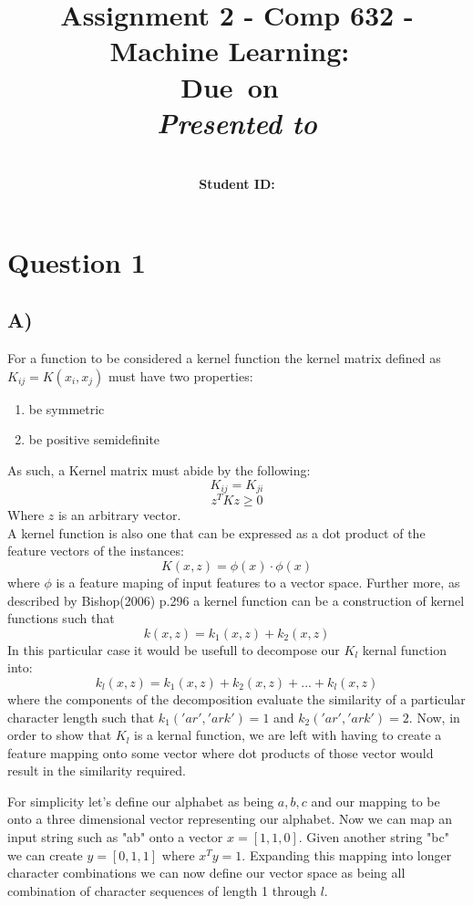 \documentclass{report}
\title{Assignment 2 - Comp 632 - Machine Learning}
\title{\vspace{2in}\textmd{\textbf{\hmwkClass:\ \hmwkTitle}}\\
\normalsize\vspace{0.1in}\small{Due\ on\ \hmwkDueDate}\\
\vspace{0.1in}\large{\textit{Presented to \hmwkClassInstructor}}\vspace{3in}}
\date{}
\author{\textbf{\hmwkAuthorName}\\
    \textbf{Student ID: \hmwkAuthorNumber}}
\begin{document}
\maketitle
\section*{Question 1}
\subsection*{A)}
For a function to be considered a kernel function the kernel matrix defined as
$K_{ij}=K(x_i,x_j)$ must have two properties:
\begin{enumerate}
  \item be symmetric
  \item be positive semidefinite
\end{enumerate}
As such, a Kernel matrix must abide by the following:
\begin{equation}
  K_{ij} = K_{ji}
\end{equation}
\begin{equation}
  z^{T}Kz\geq 0
\end{equation}
Where $z$ is an arbitrary vector. \\

A kernel function is also one that can be expressed as a dot product of the feature
vectors of the instances:
\begin{equation}
  K(x,z) = \phi (x) \cdot \phi (x)
\end{equation}
where $\phi$ is a feature maping of input features to a vector space. Further more,
as described by Bishop(2006) p.296 a kernel function can be a construction of kernel
functions such that
\begin{equation}
  k(x,z) = k_1(x,z) + k_2(x,z)
\end{equation}
In this particular case it would be usefull to decompose our $K_l$ kernal function
into:
\begin{equation}
  k_l(x,z) = k_1(x,z) + k_2(x,z) + ... + k_l(x,z)
\end{equation}
where the components of the decomposition evaluate the similarity of a particular
character length such that $k_1('ar','ark')=1$ and $k_2('ar','ark')=2$. Now, in order
to show that $K_l$ is a kernal function, we are left with having to create a feature
mapping onto some vector where dot products of those vector would result in the
similarity required.

For simplicity let's define our alphabet as being ${a,b,c}$
and our mapping to be onto a three dimensional vector representing our alphabet.
Now we can map an input string such as "ab" onto a vector $x=[1,1,0]$. Given another
string "bc" we can create $y=[0,1,1]$ where $x^Ty=1$. Expanding this mapping into
longer character combinations we can now define our vector space as being all combination
of character sequences of length 1 through $l$.
\end{document}
